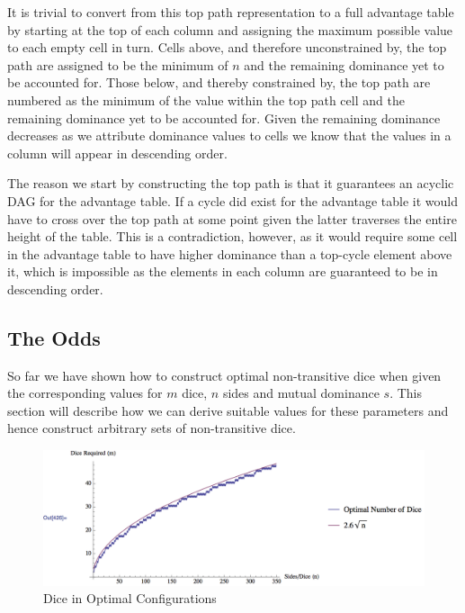 \documentclass[a4paper,twocolumn]{article}
\begin{document}
It is trivial to convert from this top path representation to a full advantage table by starting at the top of each column and assigning the maximum possible value to each empty cell in turn. Cells above, and therefore unconstrained by, the top path are assigned to be the minimum of $n$ and the remaining dominance yet to be accounted for. Those below, and thereby constrained by, the top path are numbered as the minimum of the value within the top path cell and the remaining dominance yet to be accounted for. Given the remaining dominance decreases as we attribute dominance values to cells we know that the values in a column will appear in descending order.

The reason we start by constructing the top path is that it guarantees an acyclic DAG for the advantage table. If a cycle did exist for the advantage table it would have to cross over the top path at some point given the latter traverses the entire height of the table. This is a contradiction, however, as it would require some cell in the advantage table to have higher dominance than a top-cycle element above it, which is impossible as the elements in each column are guaranteed to be in descending order.
\def\app#1#2{%
  \mathrel{%
    \setbox0=\hbox{$#1\sim$}%
    \setbox2=\hbox{%
      \rlap{\hbox{$#1\propto$}}%
      \lower1.1\ht0\box0%
    }%
    \raise0.25\ht2\box2%
  }%
}
\def\approxprop{\mathpalette\app\relax}
\subsection*{The Odds}
So far we have shown how to construct optimal non-transitive dice when given the corresponding values for $m$ dice, $n$ sides and mutual dominance $s$. This section will describe how we can derive suitable values for these parameters and hence construct arbitrary sets of non-transitive dice.

    \begin{figure}[ht]
    \includegraphics[width=\linewidth]{DicePlot}
    \caption{Dice in Optimal Configurations}
    \label{fig:graph}
    \end{figure}
 
\end{document}
